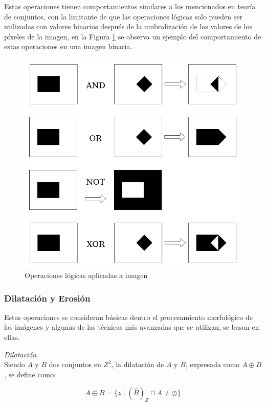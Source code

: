 Estas operaciones tienen comportamientos similares a los mencionados en teoría de conjuntos, con la limitante de que las operaciones lógicas solo pueden ser utilizadas con valores binarios después de la umbralización de los valores de los píxeles de la imagen, en la Figura \ref{fig:LogicOpIMG} se observa un ejemplo del comportamiento de estas operaciones en una imagen binaria.
\begin{figure}[H]
\centering
\includegraphics[scale=0.3]{Figures/LogicOp_IMG.png}
    \caption{Operaciones lógicas aplicadas a imagen}
    \label{fig:LogicOpIMG}
\end{figure}

\subsubsection{Dilatación y Erosión}

Estas operaciones se consideran básicas dentro el procesamiento morfológico de las imágenes y algunas  de las técnicas más avanzadas que se utilizan, se basan en ellas.

\emph{Dilatación}\\
Siendo $A$ y $B$ dos conjuntos en $Z^2$, la dilatación de $A$ y $B$, expresada como $A \oplus B$, se define como:

\begin{equation}
A \oplus B = \{ z \mid (\hat{B})_{Z} \cap A \neq \oslash \}
\label{eqn:dilatacion}
\end{equation}

